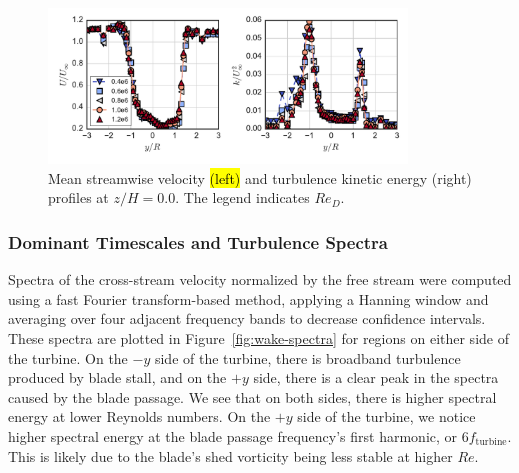 \documentclass[energies,article,accept,moreauthors,pdftex,10pt,a4paper]{mdpi}
\theoremstyle{mdpi}
\newcounter{ex}
\newcounter{re}
\begin{document}
\begin{figure}[H]
 \centering
 
 \includegraphics[width=0.85\textwidth]{figures/mean_u_k_profiles}
 
 \caption{Mean streamwise velocity \hl {(left)} and turbulence kinetic energy
 (right) profiles at $z/H=0.0$. The legend indicates $Re_D$.}
 \label{fig:profiles}
\end{figure}


\subsubsection{Dominant Timescales and Turbulence Spectra}

Spectra of the cross-stream velocity normalized by the free stream were
computed using a fast Fourier transform-based method, applying a Hanning window
and averaging over four adjacent frequency bands to decrease confidence
intervals. These spectra are plotted in Figure~\ref{fig:wake-spectra} for
regions on either side of the turbine. On the $-y$ side of the turbine, there is
broadband turbulence produced by blade stall, and on the $+y$ side, there is a
clear peak in the spectra caused by the blade passage. We see that on both sides,
there is higher spectral energy at lower Reynolds numbers. On the $+y$ side of
the turbine, we notice higher spectral energy at the blade passage frequency's
first harmonic, or $6 f_\mathrm{turbine}$. This is likely due to the blade's
shed vorticity being less stable at higher $Re$.
\end{document}

